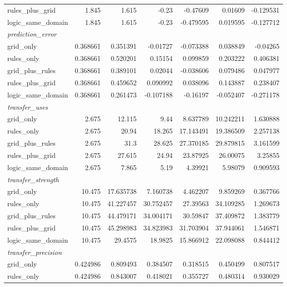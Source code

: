 \begin{tabular}{lrrrrrr}
  rules_plus_grid & 1.845 & 1.615 & -0.23 & -0.47609 & 0.01609 & -0.129531 \\
  logic_same_domain & 1.845 & 1.615 & -0.23 & -0.479595 & 0.019595 & -0.127712 \\
  \multicolumn{7}{l}{\textit{prediction_error}} \\
  grid_only & 0.368661 & 0.351391 & -0.01727 & -0.073388 & 0.038849 & -0.04265 \\
  rules_only & 0.368661 & 0.520201 & 0.15154 & 0.099859 & 0.203222 & 0.406381 \\
  grid_plus_rules & 0.368661 & 0.389101 & 0.02044 & -0.038606 & 0.079486 & 0.047977 \\
  rules_plus_grid & 0.368661 & 0.459652 & 0.090992 & 0.038096 & 0.143887 & 0.238407 \\
  logic_same_domain & 0.368661 & 0.261473 & -0.107188 & -0.16197 & -0.052407 & -0.271178 \\
  \multicolumn{7}{l}{\textit{transfer_uses}} \\
  grid_only & 2.675 & 12.115 & 9.44 & 8.637789 & 10.242211 & 1.630888 \\
  rules_only & 2.675 & 20.94 & 18.265 & 17.143491 & 19.386509 & 2.257138 \\
  grid_plus_rules & 2.675 & 31.3 & 28.625 & 27.370185 & 29.879815 & 3.161599 \\
  rules_plus_grid & 2.675 & 27.615 & 24.94 & 23.87925 & 26.00075 & 3.25855 \\
  logic_same_domain & 2.675 & 7.865 & 5.19 & 4.39921 & 5.98079 & 0.909593 \\
  \multicolumn{7}{l}{\textit{transfer_strength}} \\
  grid_only & 10.475 & 17.635738 & 7.160738 & 4.462207 & 9.859269 & 0.367766 \\
  rules_only & 10.475 & 41.227457 & 30.752457 & 27.39563 & 34.109285 & 1.269673 \\
  grid_plus_rules & 10.475 & 44.479171 & 34.004171 & 30.59847 & 37.409872 & 1.383779 \\
  rules_plus_grid & 10.475 & 45.298983 & 34.823983 & 31.703904 & 37.944061 & 1.546871 \\
  logic_same_domain & 10.475 & 29.4575 & 18.9825 & 15.866912 & 22.098088 & 0.844412 \\
  \multicolumn{7}{l}{\textit{transfer_precision}} \\
  grid_only & 0.424986 & 0.809493 & 0.384507 & 0.318515 & 0.450499 & 0.807517 \\
  rules_only & 0.424986 & 0.843007 & 0.418021 & 0.355727 & 0.480314 & 0.930029 \\

\end{tabular}
